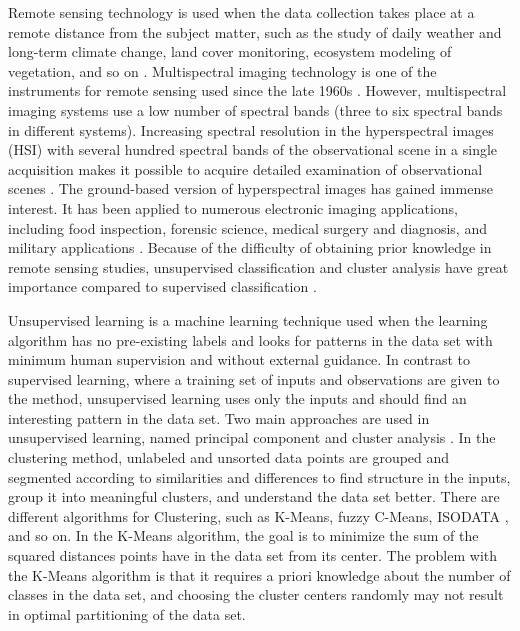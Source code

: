 \documentclass[a4paper,10pt]{article}
\begin{document}
Remote sensing technology is used when the data collection takes place at a
remote distance from the subject matter, such as the study of daily weather and
long-term climate change, land cover monitoring, ecosystem modeling of
vegetation, and so on \cite{Jensen1996,Mallapragada2018}. Multispectral imaging
technology is one of the instruments for remote sensing used since the late
1960s \cite{Khan2018,Landgrebe1999}. However, multispectral imaging systems use
a low number of spectral bands (three to six spectral bands in different
systems). Increasing spectral resolution in the hyperspectral images (HSI) with
several hundred spectral bands of the observational scene in a single
acquisition makes it possible to acquire detailed examination of observational
scenes \cite{Khan2018}. The ground-based version of hyperspectral images has
gained immense interest. It has been applied to numerous electronic imaging
applications, including food inspection, forensic science, medical surgery and
diagnosis, and military applications
\cite{Govender2009,Adam2009,Fischer2006,Carrasco2003}. Because of the difficulty
of obtaining prior knowledge in remote sensing studies, unsupervised
classification and cluster analysis have great importance compared to supervised
classification \cite{Abbas2016}.

Unsupervised learning is a machine learning technique used when the learning
algorithm has no pre-existing labels and looks for patterns in the data set with
minimum human supervision and without external guidance. In contrast to
supervised learning, where a training set of inputs and observations are given
to the method, unsupervised learning uses only the inputs and should find an
interesting pattern in the data set. Two main approaches are used in
unsupervised learning, named principal component \cite{Mallapragada2018} and
cluster analysis \cite{Xu2015}. In the clustering method, unlabeled and unsorted
data points are grouped and segmented according to similarities and differences
to find structure in the inputs, group it into meaningful clusters, and
understand the data set better. There are different algorithms for Clustering,
such as K-Means, fuzzy C-Means, ISODATA \cite{Ball1965}, and so on. In the
K-Means algorithm, the goal is to minimize the sum of the squared distances
points have in the data set from its center. The problem with the K-Means
algorithm is that it requires a priori knowledge about the number of classes in
the data set, and choosing the cluster centers randomly may not result in
optimal partitioning of the data set.
\end{document}
